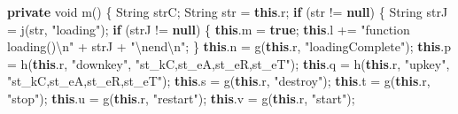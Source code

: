\documentclass[
]{article}
\newenvironment{Shaded}{}{}
\newcommand{\BuiltInTok}[1]{\textcolor[rgb]{0.00,0.50,0.00}{#1}}
\newcommand{\ControlFlowTok}[1]{\textcolor[rgb]{0.00,0.44,0.13}{\textbf{#1}}}
\newcommand{\DataTypeTok}[1]{\textcolor[rgb]{0.56,0.13,0.00}{#1}}
\newcommand{\FunctionTok}[1]{\textcolor[rgb]{0.02,0.16,0.49}{#1}}
\newcommand{\KeywordTok}[1]{\textcolor[rgb]{0.00,0.44,0.13}{\textbf{#1}}}
\newcommand{\NormalTok}[1]{#1}
\newcommand{\OperatorTok}[1]{\textcolor[rgb]{0.40,0.40,0.40}{#1}}
\newcommand{\SpecialCharTok}[1]{\textcolor[rgb]{0.25,0.44,0.63}{#1}}
\newcommand{\StringTok}[1]{\textcolor[rgb]{0.25,0.44,0.63}{#1}}
\begin{document}
\begin{Shaded}
\begin{Highlighting}[]
    \KeywordTok{private} \DataTypeTok{void} \FunctionTok{m}\OperatorTok{()} \OperatorTok{\{}
        \BuiltInTok{String}\NormalTok{ strC}\OperatorTok{;}
        \BuiltInTok{String}\NormalTok{ str }\OperatorTok{=} \KeywordTok{this}\OperatorTok{.}\FunctionTok{r}\OperatorTok{;}
        \ControlFlowTok{if} \OperatorTok{(}\NormalTok{str }\OperatorTok{!=} \KeywordTok{null}\OperatorTok{)} \OperatorTok{\{}
            \BuiltInTok{String}\NormalTok{ strJ }\OperatorTok{=} \FunctionTok{j}\OperatorTok{(}\NormalTok{str}\OperatorTok{,} \StringTok{"loading"}\OperatorTok{);}
            \ControlFlowTok{if} \OperatorTok{(}\NormalTok{strJ }\OperatorTok{!=} \KeywordTok{null}\OperatorTok{)} \OperatorTok{\{}
                \KeywordTok{this}\OperatorTok{.}\FunctionTok{m} \OperatorTok{=} \KeywordTok{true}\OperatorTok{;}
                \KeywordTok{this}\OperatorTok{.}\FunctionTok{l} \OperatorTok{+=} \StringTok{"function loading()}\SpecialCharTok{\textbackslash{}n}\StringTok{"} \OperatorTok{+}\NormalTok{ strJ }\OperatorTok{+} \StringTok{"}\SpecialCharTok{\textbackslash{}n}\StringTok{end}\SpecialCharTok{\textbackslash{}n}\StringTok{"}\OperatorTok{;}
            \OperatorTok{\}}
            \KeywordTok{this}\OperatorTok{.}\FunctionTok{n} \OperatorTok{=} \FunctionTok{g}\OperatorTok{(}\KeywordTok{this}\OperatorTok{.}\FunctionTok{r}\OperatorTok{,} \StringTok{"loadingComplete"}\OperatorTok{);}
            \KeywordTok{this}\OperatorTok{.}\FunctionTok{p} \OperatorTok{=} \FunctionTok{h}\OperatorTok{(}\KeywordTok{this}\OperatorTok{.}\FunctionTok{r}\OperatorTok{,} \StringTok{"downkey"}\OperatorTok{,} \StringTok{"st\_kC,st\_eA,st\_eR,st\_eT"}\OperatorTok{);}
            \KeywordTok{this}\OperatorTok{.}\FunctionTok{q} \OperatorTok{=} \FunctionTok{h}\OperatorTok{(}\KeywordTok{this}\OperatorTok{.}\FunctionTok{r}\OperatorTok{,} \StringTok{"upkey"}\OperatorTok{,} \StringTok{"st\_kC,st\_eA,st\_eR,st\_eT"}\OperatorTok{);}
            \KeywordTok{this}\OperatorTok{.}\FunctionTok{s} \OperatorTok{=} \FunctionTok{g}\OperatorTok{(}\KeywordTok{this}\OperatorTok{.}\FunctionTok{r}\OperatorTok{,} \StringTok{"destroy"}\OperatorTok{);}
            \KeywordTok{this}\OperatorTok{.}\FunctionTok{t} \OperatorTok{=} \FunctionTok{g}\OperatorTok{(}\KeywordTok{this}\OperatorTok{.}\FunctionTok{r}\OperatorTok{,} \StringTok{"stop"}\OperatorTok{);}
            \KeywordTok{this}\OperatorTok{.}\FunctionTok{u} \OperatorTok{=} \FunctionTok{g}\OperatorTok{(}\KeywordTok{this}\OperatorTok{.}\FunctionTok{r}\OperatorTok{,} \StringTok{"restart"}\OperatorTok{);}
            \KeywordTok{this}\OperatorTok{.}\FunctionTok{v} \OperatorTok{=} \FunctionTok{g}\OperatorTok{(}\KeywordTok{this}\OperatorTok{.}\FunctionTok{r}\OperatorTok{,} \StringTok{"start"}\OperatorTok{);}

\end{Highlighting}
\end{Shaded}
\end{document}
